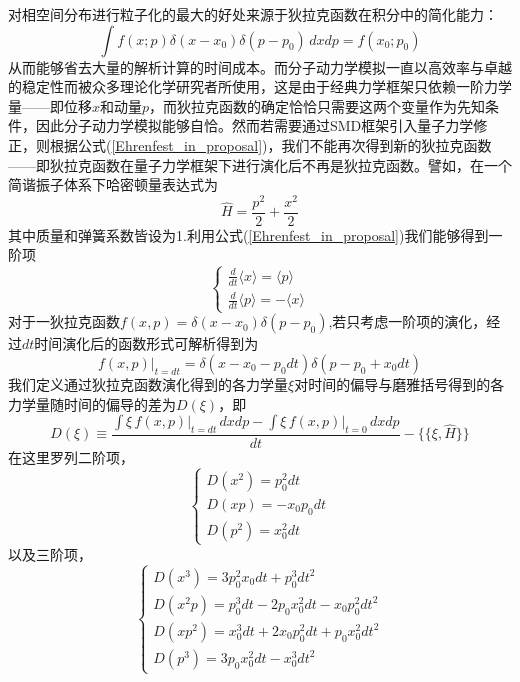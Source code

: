 对相空间分布进行粒子化的最大的好处来源于狄拉克函数在积分中的简化能力：
\begin{equation}
	\int f(x;p) \delta (x- x_0) \delta (p- p_0) \, dx dp = f(x_0;p_0)
\end{equation}
从而能够省去大量的解析计算的时间成本。而分子动力学模拟一直以高效率与卓越的稳定性而被众多理论化学研究者所使用，这是由于经典力学框架只依赖一阶力学量——即位移$x$和动量$p$，而狄拉克函数的确定恰恰只需要这两个变量作为先知条件，因此分子动力学模拟能够自恰。然而若需要通过SMD框架引入量子力学修正，则根据公式(\ref{Ehrenfest_in_proposal})，我们不能再次得到新的狄拉克函数——即狄拉克函数在量子力学框架下进行演化后不再是狄拉克函数。譬如，在一个简谐振子体系下哈密顿量表达式为
\begin{equation}
	\hat{H} = \frac{p^2}{2} + \frac{x^2}{2}
\end{equation}
其中质量和弹簧系数皆设为1.利用公式(\ref{Ehrenfest_in_proposal})我们能够得到一阶项
\begin{equation}
	\begin{cases}
	\frac{d }{dt}\langle x \rangle = \langle p \rangle \\
	\frac{d }{dt}\langle p \rangle = - \langle x \rangle
	\end{cases}
\end{equation}
对于一狄拉克函数$f(x,p) = \delta(x-x_0)\delta(p-p_0)$,若只考虑一阶项的演化，经过$dt$时间演化后的函数形式可解析得到为
\begin{equation}
f(x,p) \big|_{t=dt} = \delta(x-x_0 - p_0dt) \delta(p-p_0+x_0dt)
\end{equation}
我们定义通过狄拉克函数演化得到的各力学量$\xi$对时间的偏导与磨雅括号得到的各力学量随时间的偏导的差为$D(\xi)$，即
\begin{equation}
	D(\xi) \equiv \frac{\int \xi \, f(x,p) \big|_{t=dt} \, dx dp - \int \xi \, f(x,p) \big|_{t=0} \, dx dp }{dt} - \{\{\xi,\hat{H}\}\}
\end{equation}
在这里罗列二阶项，
\begin{equation}
	\begin{cases}
		D(x^2) = p_0^2 dt \\
		D(x p) = - x_0 p_0 dt \\
		D(p^2) = x_0^2 dt
	\end{cases}
\end{equation}
以及三阶项，
\begin{equation}
	\begin{cases}
		D(x^3) = 3 p_0^2 x_0 dt + p_0^3 dt^2\\
		D(x^2 p) = p_0^3 dt - 2 p_0 x_0^2 dt - x_0p_0^2 dt^2\\
		D(x p^2) = x_0^3 dt + 2x_0 p_0^2 dt + p_0 x_0^2 dt^2 \\
		D(p^3) = 3 p_0 x_0^2 dt - x_0^3 dt^2
	\end{cases}
\end{equation}
